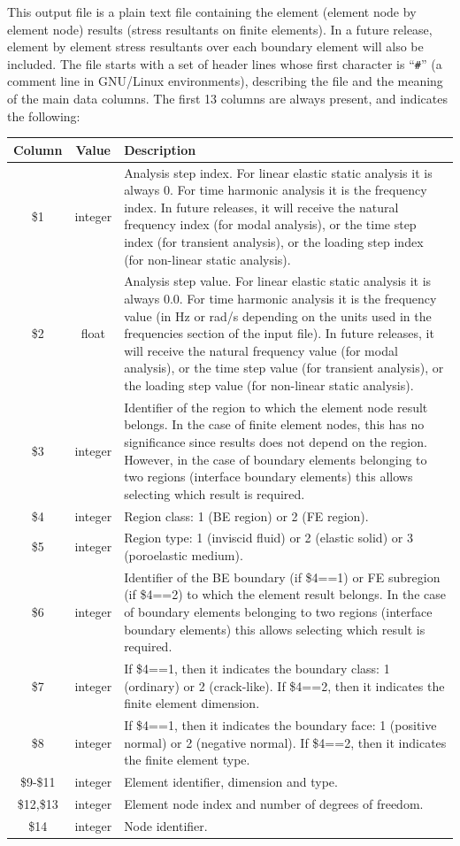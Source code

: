 \documentclass[a4paper,fleqn]{book}
\begin{document}
This output file is a plain text file containing the element (element node by element node) results (stress resultants on finite elements). In a future release, element by element stress resultants over each boundary element will also be included. The file starts with a set of header lines whose first character is ``\texttt{\#}'' (a comment line in GNU/Linux environments), describing the file and the meaning of the main data columns. The first 13 columns are always present, and indicates the following:
\begin{longtable}{ccp{11cm}}
\textbf{Column} & \textbf{Value} &\textbf{Description} \\ 
\endhead
\midrule
\$1 & integer & Analysis step index. For linear elastic static analysis it is always 0. For time harmonic analysis it is the frequency index. In future releases, it will receive the natural frequency index (for modal analysis), or the time step index (for transient analysis), or the loading step index (for non-linear static analysis). \\
\$2 & float & Analysis step value. For linear elastic static analysis it is always 0.0. For time harmonic analysis it is the frequency value (in Hz or rad/s depending on the units used in the frequencies section of the input file). In future releases, it will receive the natural frequency value (for modal analysis), or the time step value (for transient analysis), or the loading step value (for non-linear static analysis). \\
\$3 & integer & Identifier of the region to which the element node result belongs. In the case of finite element nodes, this has no significance since results does not depend on the region. However, in the case of boundary elements belonging to two regions (interface boundary elements) this allows selecting which result is required. \\
\$4 & integer & Region class: 1 (BE region) or 2 (FE region). \\
\$5 & integer & Region type: 1 (inviscid fluid) or 2 (elastic solid) or 3 (poroelastic medium). \\
\$6 & integer & Identifier of the BE boundary (if \$4==1) or FE subregion (if \$4==2) to which the element result belongs. In the case of boundary elements belonging to two regions (interface boundary elements) this allows selecting which result is required. \\
\$7 & integer & If \$4==1, then it indicates the boundary class: 1 (ordinary) or 2 (crack-like). If \$4==2, then it indicates the finite element dimension. \\
\$8 & integer & If \$4==1, then it indicates the boundary face: 1 (positive normal) or 2 (negative normal). If \$4==2, then it indicates the finite element type. \\
\$9-\$11 & integer & Element identifier, dimension and type. \\
\$12,\$13 & integer & Element node index and number of degrees of freedom. \\
\$14 & integer & Node identifier. \\
\end{longtable}
\end{document}
